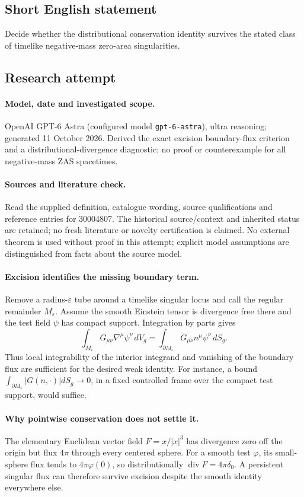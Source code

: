 \documentclass[11pt]{article}
\begin{document}
\subsection{Short English statement}
Decide whether the distributional conservation identity survives the stated class of timelike negative-mass zero-area singularities.
\subsection{Research attempt}
\paragraph{Model, date and investigated scope.}
OpenAI GPT-6 Astra (configured model \texttt{gpt-6-astra}), ultra reasoning; generated 11 October 2026. Derived the exact excision boundary-flux criterion and a distributional-divergence diagnostic; no proof or counterexample for all negative-mass ZAS spacetimes.

\paragraph{Sources and literature check.}
Read the supplied definition, catalogue wording, source qualifications and reference entries for 30004807. The historical source/context and inherited status are retained; no fresh literature or novelty certification is claimed. No external theorem is used without proof in this attempt; explicit model assumptions are distinguished from facts about the source model.

\paragraph{Excision identifies the missing boundary term.} Remove a radius-\(\varepsilon\) tube around a timelike singular locus and call the regular remainder \(M_\varepsilon\). Assume the smooth Einstein tensor is divergence free there and the test field \(\psi\) has compact support. Integration by parts gives
\[
 \int_{M_\varepsilon}G_{\mu\nu}\nabla^\mu\psi^\nu\,dV_g
 =\int_{\partial M_\varepsilon}G_{\mu\nu}n^\mu\psi^\nu\,dS_g.
\]
Thus local integrability of the interior integrand and vanishing of the boundary flux are sufficient for the desired weak identity. For instance, a bound \(\int_{\partial M_\varepsilon}|G(n,\cdot)|dS_g\to0\), in a fixed controlled frame over the compact test support, would suffice.
\paragraph{Why pointwise conservation does not settle it.} The elementary Euclidean vector field \(F=x/|x|^3\) has divergence zero off the origin but flux \(4\pi\) through every centered sphere. For a smooth test \(\varphi\), its small-sphere flux tends to \(4\pi\varphi(0)\), so distributionally \(\operatorname{div}F=4\pi\delta_0\). A persistent singular flux can therefore survive excision despite the smooth identity everywhere else.
\end{document}
